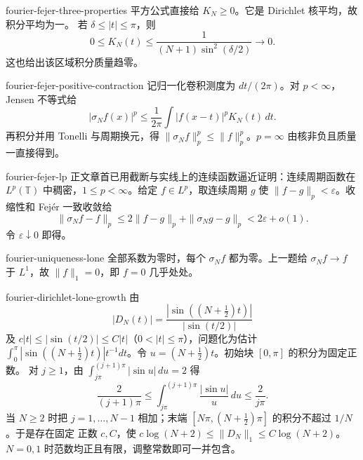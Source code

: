 \begin{solution}{fourier-fejer-three-properties}
平方公式直接给 \(K_N\ge0\)。它是 Dirichlet 核平均，故积分平均为一。
若 \(\delta\le|t|\le\pi\)，则
\[
 0\le K_N(t)\le\frac1{(N+1)\sin^2(\delta/2)}\to0.
\]
这也给出该区域积分质量趋零。
\end{solution}

\begin{solution}{fourier-fejer-positive-contraction}
记归一化卷积测度为 \(dt/(2\pi)\)。对 \(p<\infty\)，Jensen 不等式给
\[
 |\sigma_Nf(x)|^p
 \le\frac1{2\pi}\int |f(x-t)|^pK_N(t)\,dt.
\]
再积分并用 Tonelli 与周期换元，得
\(\|\sigma_Nf\|_p^p\le\|f\|_p^p\)。\(p=\infty\) 由核非负且质量一直接得到。
\end{solution}

\begin{solution}{fourier-fejer-lp}
正文章首已用截断与实线上的连续函数逼近证明：连续周期函数在
\(L^p(\mathbb T)\) 中稠密，\(1\le p<\infty\)。给定 \(f\in L^p\)，取连续周期 \(g\) 使
\(\|f-g\|_p<\varepsilon\)。收缩性和 Fejér 一致收敛给
\[
 \|\sigma_Nf-f\|_p
 \le2\|f-g\|_p+\|\sigma_Ng-g\|_p
 <2\varepsilon+o(1).
\]
令 \(\varepsilon\downarrow0\) 即得。
\end{solution}

\begin{solution}{fourier-uniqueness-lone}
全部系数为零时，每个 \(\sigma_Nf\) 都为零。上一题给
\(\sigma_Nf\to f\) 于 \(L^1\)，故 \(\|f\|_1=0\)，即 \(f=0\) 几乎处处。
\end{solution}

\begin{solution}{fourier-dirichlet-lone-growth}
由
\[
 |D_N(t)|=\frac{|\sin((N+\tfrac12)t)|}{|\sin(t/2)|}
\]
及 \(c|t|\le|\sin(t/2)|\le C|t|\)（\(0<|t|\le\pi\)），问题化为估计
\(\int_0^\pi|\sin((N+\tfrac12)t)|t^{-1}dt\)。令
\(u=(N+\tfrac12)t\)。初始块 \([0,\pi]\) 的积分为固定正数。
对 \(j\ge1\)，由 \(\int_{j\pi}^{(j+1)\pi}|\sin u|\,du=2\) 得
\[
 \frac{2}{(j+1)\pi}\le
 \int_{j\pi}^{(j+1)\pi}\frac{|\sin u|}{u}\,du
 \le\frac{2}{j\pi}.
\]
当 \(N\ge2\) 时把 \(j=1,\ldots,N-1\) 相加；末端
\([N\pi,(N+\tfrac12)\pi]\) 的积分不超过 \(1/N\)。于是存在固定
正数 \(c,C\)，使 \(c\log(N+2)\le\|D_N\|_1\le C\log(N+2)\)。
\(N=0,1\) 时范数均正且有限，调整常数即可一并包含。
\end{solution}

